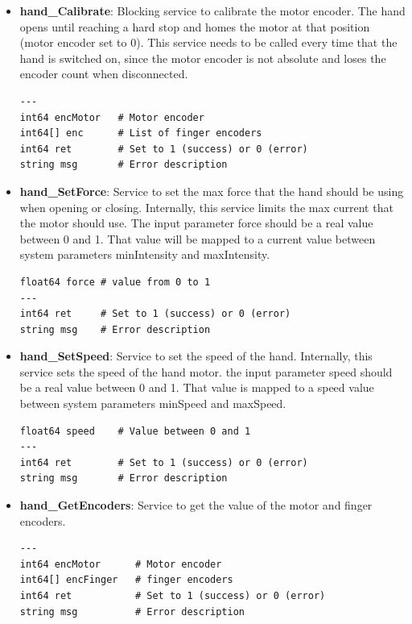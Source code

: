 \documentclass[letterpaper,notitlepage,11pt]{article}
\begin{document}
\begin{itemize}
\item \textbf{hand\_Calibrate}: Blocking service to calibrate the motor
  encoder. The hand opens until reaching a hard stop and homes the
  motor at that position (motor encoder set to 0). This service needs
  to be called every time that the hand is switched on, since the
  motor encoder is not absolute and loses the encoder count when
  disconnected.

\begin{verbatim}
---
int64 encMotor   # Motor encoder
int64[] enc      # List of finger encoders
int64 ret        # Set to 1 (success) or 0 (error)
string msg       # Error description
\end{verbatim}

\item \textbf{hand\_SetForce}: Service to set the max force that the
  hand should be using when opening or closing. Internally, this
  service limits the max current that the motor should use. The input
  parameter force should be a real value between 0 and 1. That value
  will be mapped to a current value between system parameters
  minIntensity and maxIntensity.

\begin{verbatim}
float64 force # value from 0 to 1
---
int64 ret     # Set to 1 (success) or 0 (error)
string msg    # Error description
\end{verbatim}

\item \textbf{hand\_SetSpeed}: Service to set the speed of the
  hand. Internally, this service sets the speed of the hand motor. the
  input parameter speed should be a real value between 0 and 1.  That
  value is mapped to a speed value between system parameters minSpeed
  and maxSpeed.

\begin{verbatim}
float64 speed    # Value between 0 and 1
---
int64 ret        # Set to 1 (success) or 0 (error)
string msg       # Error description
\end{verbatim}

\item \textbf{hand\_GetEncoders}: Service to get the value of the
  motor and finger encoders.

\begin{verbatim}
---
int64 encMotor      # Motor encoder
int64[] encFinger   # finger encoders
int64 ret           # Set to 1 (success) or 0 (error)
string msg          # Error description
\end{verbatim}


\end{itemize}
\end{document}

